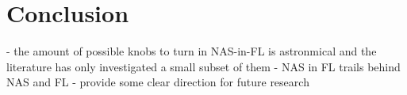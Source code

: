 \chapter{Conclusion}\label{chapter:conclusion}

- the amount of possible knobs to turn in NAS-in-FL is astronmical and the literature has only investigated a small subset of them
- NAS in FL trails behind NAS and FL
- provide some clear direction for future research
